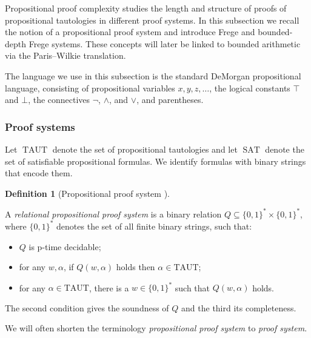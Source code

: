 \documentclass{article}
\theoremstyle{plain}
\theoremstyle{definition}
\newtheorem{definition}[theorem]{Definition}
\DeclareMathOperator{\TAUT}{TAUT}
\DeclareMathOperator{\SAT}{SAT}
\begin{document}
Propositional proof complexity studies the length and structure of proofs of propositional tautologies in different proof systems. In this subsection we recall the notion of
a propositional proof system and introduce Frege and bounded-depth Frege systems. These concepts will later be linked to bounded arithmetic via the Paris--Wilkie translation.

The language we use in this subsection is the standard DeMorgan propositional language, consisting of propositional variables $x, y, z, \dots$, the logical constants $\top$ and $\bot$, the connectives $\neg$, $\wedge$, and $\vee$, and parentheses.


\subsubsection{Proof systems}\label{proof_systems}

Let $\TAUT$ denote the set of propositional tautologies and let $\SAT$ denote the set of satisfiable propositional formulas. We identify formulas with binary strings that encode them.


\begin{definition}[Propositional proof system {\cite[Definition~1.3]{cook1979relative}}]\label{def:proof_system}



A \emph{relational propositional proof system} is a binary relation 
\(Q \subseteq \{0,1\}^* \times \{0,1\}^*\), where $\{0,1\}^*$ denotes the set of all finite binary strings, such that:
\begin{itemize}
    \item \(Q\) is p-time decidable;
    \item for any \(w, \alpha\), if \(Q(w,\alpha)\) holds then \(\alpha \in \mathrm{TAUT}\);
    \item for any \(\alpha \in \mathrm{TAUT}\), there is a \(w \in \{0,1\}^*\) such that \(Q(w,\alpha)\) holds.
\end{itemize}

The second condition gives the soundness of \(Q\) and the third its completeness.
\end{definition} 

We will often shorten the terminology \emph{propositional proof system} to \emph{proof system}.
\end{document}
